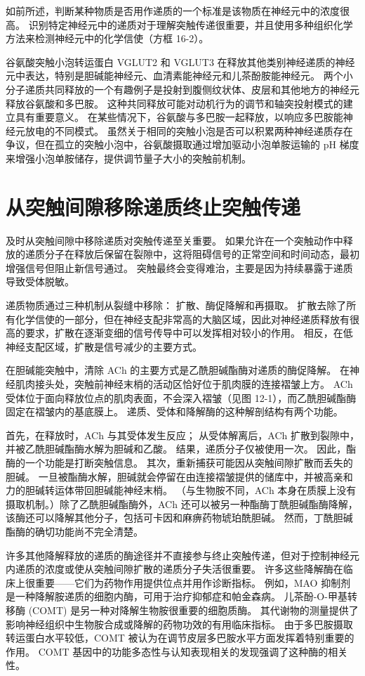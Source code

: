 如前所述，判断某种物质是否用作递质的一个标准是该物质在神经元中的浓度很高。
识别特定神经元中的递质对于理解突触传递很重要，并且使用多种组织化学方法来检测神经元中的化学信使（方框 16-2）。


谷氨酸突触小泡转运蛋白 VGLUT2 和 VGLUT3 在释放其他类别神经递质的神经元中表达，特别是胆碱能神经元、血清素能神经元和儿茶酚胺能神经元。
两个小分子递质共同释放的一个有趣例子是投射到腹侧纹状体、皮层和其他地方的神经元释放谷氨酸和多巴胺。 这种共同释放可能对动机行为的调节和轴突投射模式的建立具有重要意义。
在某些情况下，谷氨酸与多巴胺一起释放，以响应多巴胺能神经元放电的不同模式。
虽然关于相同的突触小泡是否可以积累两种神经递质存在争议，但在孤立的突触小泡中，谷氨酸摄取通过增加驱动小泡单胺运输的 pH 梯度来增强小泡单胺储存，提供调节量子大小的突触前机制。



\section{从突触间隙移除递质终止突触传递}

及时从突触间隙中移除递质对突触传递至关重要。
如果允许在一个突触动作中释放的递质分子在释放后保留在裂隙中，这将阻碍信号的正常空间和时间动态，最初增强信号但阻止新信号通过。
突触最终会变得难治，主要是因为持续暴露于递质导致受体脱敏。


递质物质通过三种机制从裂缝中移除：
扩散、酶促降解和再摄取。
扩散去除了所有化学信使的一部分，但在神经支配非常高的大脑区域，因此对神经递质释放有很高的要求，扩散在逐渐变细的信号传导中可以发挥相对较小的作用。
相反，在低神经支配区域，扩散是信号减少的主要方式。


在胆碱能突触中，清除 ACh 的主要方式是乙酰胆碱酯酶对递质的酶促降解。
在神经肌肉接头处，突触前神经末梢的活动区恰好位于肌肉膜的连接褶皱上方。
ACh 受体位于面向释放位点的肌肉表面，不会深入褶皱（见图 12-1），而乙酰胆碱酯酶固定在褶皱内的基底膜上。
递质、受体和降解酶的这种解剖结构有两个功能。


首先，在释放时，ACh 与其受体发生反应；
从受体解离后，ACh 扩散到裂隙中，并被乙酰胆碱酯酶水解为胆碱和乙酸。
结果，递质分子仅被使用一次。
因此，酯酶的一个功能是打断突触信息。
其次，重新捕获可能因从突触间隙扩散而丢失的胆碱。
一旦被酯酶水解，胆碱就会停留在由连接褶皱提供的储库中，并被高亲和力的胆碱转运体带回胆碱能神经末梢。
（与生物胺不同，ACh 本身在质膜上没有摄取机制。）除了乙酰胆碱酯酶外，ACh 还可以被另一种酯酶丁酰胆碱酯酶降解，该酶还可以降解其他分子，包括可卡因和麻痹药物琥珀酰胆碱。
然而，丁酰胆碱酯酶的确切功能尚不完全清楚。


许多其他降解释放的递质的酶途径并不直接参与终止突触传递，但对于控制神经元内递质的浓度或使从突触间隙扩散的递质分子失活很重要。
许多这些降解酶在临床上很重要——它们为药物作用提供位点并用作诊断指标。
例如，MAO 抑制剂是一种降解胺递质的细胞内酶，可用于治疗抑郁症和帕金森病。
儿茶酚-O-甲基转移酶 (COMT) 是另一种对降解生物胺很重要的细胞质酶。
其代谢物的测量提供了影响神经组织中生物胺合成或降解的药物功效的有用临床指标。
由于多巴胺摄取转运蛋白水平较低，COMT 被认为在调节皮层多巴胺水平方面发挥着特别重要的作用。
COMT 基因中的功能多态性与认知表现相关的发现强调了这种酶的相关性。


